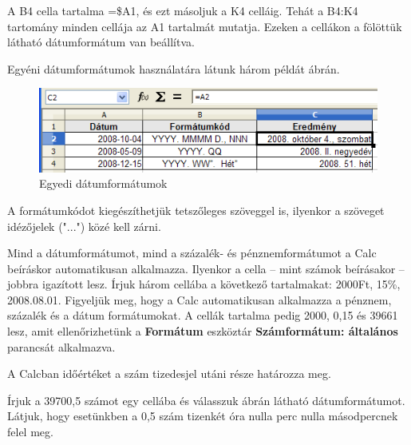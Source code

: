 A B4 cella tartalma =\$A1, és ezt másoljuk a K4 celláig. Tehát a
B4:K4 tartomány minden cellája az A1 tartalmát mutatja. Ezeken a
cellákon a fölöttük látható dátumformátum van
beállítva.

Egyéni dátumformátumok használatára látunk három
példát  ábrán.

\begin{figure}[!h]
\begin{center}
\includegraphics[width=13.095cm]{oocalcv2-img48.png}
\caption{Egyedi dátumformátumok}\label{EgyediDátumformátumok}
\end{center}
\end{figure}

A formátumkódot kiegészíthetjük tetszőleges szöveggel
is, ilyenkor a szöveget idézőjelek
("...") közé kell zárni.

Mind a dátumformátumot, mind a százalék- és
pénznemformátumot a Calc beíráskor automatikusan alkalmazza.
Ilyenkor a cella --  mint számok beírásakor --  jobbra igazított
lesz. Írjuk három cellába a következő tartalmakat: 2000Ft,
15\%, 2008.08.01. Figyeljük meg, hogy a Calc automatikusan alkalmazza
a pénznem, százalék és a dátum formátumokat. A cellák
tartalma pedig 2000, 0,15 és 39661 lesz, amit ellenőrizhetünk a
\textbf{Formátum} eszköztár \textbf{Számformátum:
általános} parancsát alkalmazva.

A Calcban időértéket a szám tizedesjel utáni része
határozza meg.

Írjuk a 39700,5 számot egy cellába és válasszuk 
ábrán látható dátumformátumot. Látjuk,  hogy
esetünkben a 0,5 szám tizenkét óra nulla perc nulla
másodpercnek felel meg.

